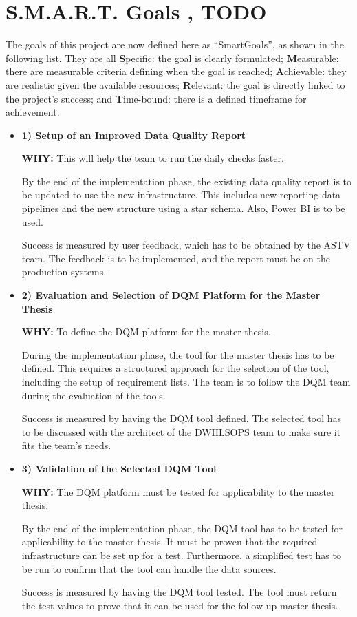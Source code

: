 \section{S.M.A.R.T. Goals , TODO}
\label{ResearchSmartGoals}

The goals of this project are now defined here as “\gls{SmartGoals}”, as shown in the following list. They are all \textbf{S}pecific: the goal is clearly formulated; \textbf{M}easurable: there are measurable criteria defining when the goal is reached; \textbf{A}chievable: they are realistic given the available resources; \textbf{R}elevant: the goal is directly linked to the project’s success; and \textbf{T}ime-bound: there is a defined timeframe for achievement.

\begin{itemize}
\item \textbf{1) Setup of an Improved Data Quality Report}
    
\textbf{WHY:} This will help the team to run the daily checks faster.

By the end of the implementation phase, the existing data quality report is to be updated to use the new infrastructure. This includes new reporting data pipelines and the new structure using a star schema. Also, Power BI is to be used.

Success is measured by user feedback, which has to be obtained by the \gls{ASTV} team. The feedback is to be implemented, and the report must be on the production systems.

\item \textbf{2) Evaluation and Selection of DQM Platform for the Master Thesis}
    
\textbf{WHY:} To define the DQM platform for the master thesis.

During the implementation phase, the tool for the master thesis has to be defined. This requires a structured approach for the selection of the tool, including the setup of requirement lists. The team is to follow the DQM team during the evaluation of the tools.

Success is measured by having the DQM tool defined. The selected tool has to be discussed with the architect of the \gls{DWHLSOPS} team to make sure it fits the team's needs.

\item \textbf{3) Validation of the Selected DQM Tool}
    
\textbf{WHY:} The DQM platform must be tested for applicability to the master thesis.

By the end of the implementation phase, the DQM tool has to be tested for applicability to the master thesis. It must be proven that the required infrastructure can be set up for a test. Furthermore, a simplified test has to be run to confirm that the tool can handle the data sources.

Success is measured by having the DQM tool tested. The tool must return the test values to prove that it can be used for the follow-up master thesis.

\end{itemize}